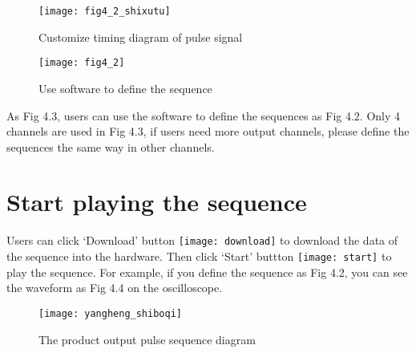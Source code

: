 \newpage
\vspace{0.6cm}
\begin{figure}[H]
\centering
\texttt{[image: fig4\_2\_shixutu]}
\caption{\hspace{0.2cm}Customize timing diagram of pulse signal}
\end{figure}

\vspace{1cm}
\begin{figure}[H]
\centering
\texttt{[image: fig4\_2]}
\caption{\hspace{0.2cm}Use software to define the sequence}
\end{figure}
\vspace{0.1cm}
\hspace{-0.2cm}As Fig 4.3, users can use the software to define the sequences as Fig 4.2. Only 4 channels are used in Fig 4.3, if users need more output channels, please define the sequences the same way in other channels.

\section{\heiti Start playing the sequence}
\hspace{-0.2cm}Users can click `Download' button \texttt{[image: download]} to download the data of the sequence into the hardware. Then click `Start' buttton \texttt{[image: start]} to play the sequence. For example, if you define the sequence as Fig 4.2, you can see the waveform as Fig 4.4 on the oscilloscope.

\begin{figure}[htbp]
\centering
\texttt{[image: yangheng\_shiboqi]}
\caption{\hspace{0.2cm}The product output pulse sequence diagram}
\end{figure}

